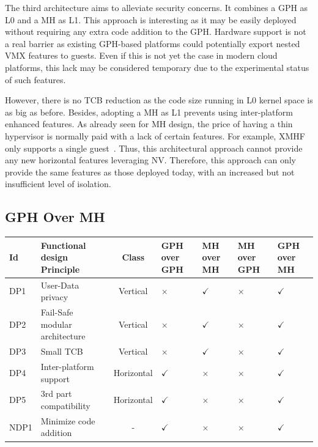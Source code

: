 \documentclass{sig-alternate}
\begin{document}
\noindent The third architecture aims to alleviate security concerns. It combines a GPH as L0 and a MH as L1. 
This approach is interesting as it may be easily deployed without requiring any extra code addition to the GPH.  Hardware support is not a real barrier as existing GPH-based platforms could potentially export nested VMX features to guests. Even if this is not yet the case in modern cloud platforms, this lack may be considered temporary due to the experimental status of such features.

However, there is no TCB reduction as the code size running in L0 kernel space is as big as before. 
Besides, adopting a MH as L1 prevents using inter-platform enhanced features. As already seen for MH design, the price of having a thin hypervisor is normally paid with a lack of certain features. For example, XMHF only supports a single guest~\cite{xmhf}. Thus, this architectural approach cannot provide any new horizontal features leveraging NV. Therefore, this approach can only provide the same features as those deployed today, with an increased but not insufficient level of isolation.

\subsection{GPH Over MH}
\label{par:gom}

\begin{table}
\label{fin:conf}
\centering
\begin{tabular}{llcllll}
\toprule
Id & Functional design Principle & Class & GPH over GPH & MH over MH & MH over GPH & GPH over MH\\
\midrule
DP1 & User-Data privacy & Vertical & $\times$  & $\checkmark$ & $\times $ & $\checkmark$ \\
DP2 & Fail-Safe modular architecture & Vertical & $\times$  & $\checkmark$ & $\times$ & $\checkmark$ \\
DP3 & Small TCB & Vertical &  $\times$& $\checkmark$ & $\times$ & $\checkmark$ \\
DP4 & Inter-platform support & Horizontal & $\checkmark$  & $\times$ & $\times$ & $\checkmark$ \\
DP5 & 3rd part compatibility & Horizontal & $\checkmark$  & $\times$ & $\times$ & $\checkmark$ \\
NDP1 & Minimize code addition & - & $\checkmark$  & $\times$ & $\times$ & $\checkmark$ \\
\bottomrule
\end{tabular}
\end{table}
\end{document}
